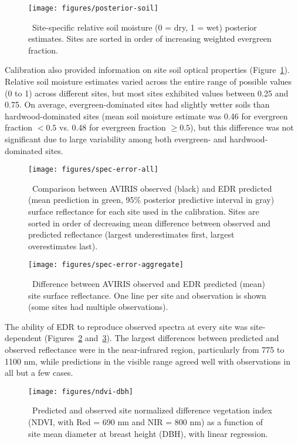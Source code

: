 \begin{figure}[ht]
  \centering
  \texttt{[image: figures/posterior-soil]}
  \caption{\label{fig:posterior-soil}\
    Site-specific relative soil moisture (0 = dry, 1 = wet) posterior estimates.
    Sites are sorted in order of increasing weighted evergreen fraction.
  }
\end{figure}

Calibration also provided information on site soil optical properties (Figure~\ref{fig:posterior-soil}).
Relative soil moisture estimates varied across the entire range of possible values (0 to 1) across different sites, but most sites exhibited values between 0.25 and 0.75.
On average, evergreen-dominated sites had slightly wetter soils than hardwood-dominated sites
(mean soil moisture estimate was 0.46 for evergreen fraction $< 0.5$ vs. 0.48 for evergreen fraction $\geq 0.5$),
but this difference was not significant due to large variability among both evergreen- and hardwood-dominated sites.

\begin{figure}
  \centering
  \texttt{[image: figures/spec-error-all]}
  \caption{\label{fig:spec-error-all}\
    Comparison between AVIRIS observed (black)
    and EDR predicted (mean prediction in green, 95\% posterior predictive interval in gray)
    surface reflectance for each site used in the calibration.
    Sites are sorted in order of decreasing mean difference between observed and predicted reflectance
    (largest underestimates first, largest overestimates last).
  }
\end{figure}

\begin{figure}
  \centering
  \texttt{[image: figures/spec-error-aggregate]}
  \caption{\label{fig:spec-error-aggregate}\
    Difference between AVIRIS observed and EDR predicted (mean) site surface reflectance.
    One line per site and observation is shown (some sites had multiple observations).
  }
\end{figure}

The ability of EDR to reproduce observed spectra at every site was site-dependent (Figures~\ref{fig:spec-error-all} and~\ref{fig:spec-error-aggregate}).
The largest differences between predicted and observed reflectance were in the near-infrared region, particularly from 775 to 1100 nm,
while predictions in the visible range agreed well with observations in all but a few cases.

\begin{figure}[ht]
  \centering
  \texttt{[image: figures/ndvi-dbh]}
  \caption{\label{fig:ndvi-dbh}\
    Predicted and observed site normalized difference vegetation index (NDVI, with Red = 690 nm and NIR = 800 nm)
    as a function of site mean diameter at breast height (DBH), with linear regression.
  }
\end{figure}

